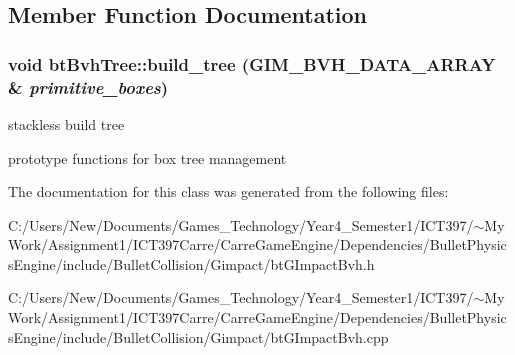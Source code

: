 \subsection{Member Function Documentation}
\hypertarget{classbt_bvh_tree_ed589b2985838c6268597f4f64a96c46}{
\subsubsection[build\_\-tree]{\setlength{\rightskip}{0pt plus 5cm}void btBvhTree::build\_\-tree (GIM\_\-BVH\_\-DATA\_\-ARRAY \& {\em primitive\_\-boxes})}}
\label{classbt_bvh_tree_ed589b2985838c6268597f4f64a96c46}


stackless build tree 

prototype functions for box tree management 

The documentation for this class was generated from the following files:\begin{CompactItemize}
\item 
C:/Users/New/Documents/Games\_\-Technology/Year4\_\-Semester1/ICT397/$\sim$My Work/Assignment1/ICT397Carre/CarreGameEngine/Dependencies/BulletPhysicsEngine/include/BulletCollision/Gimpact/btGImpactBvh.h\item 
C:/Users/New/Documents/Games\_\-Technology/Year4\_\-Semester1/ICT397/$\sim$My Work/Assignment1/ICT397Carre/CarreGameEngine/Dependencies/BulletPhysicsEngine/include/BulletCollision/Gimpact/btGImpactBvh.cpp\end{CompactItemize}
